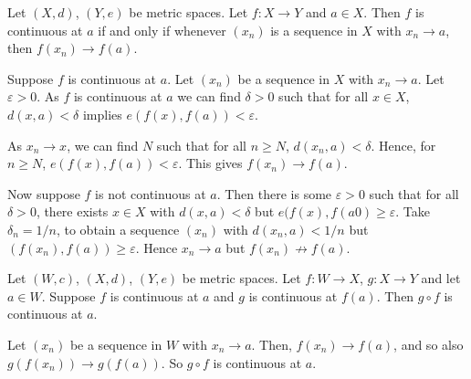 \documentclass[12pt]{article}
\begin{document}
\begin{proposition}
	Let $(X, d)$, $(Y, e)$ be metric spaces. Let $f : X \to Y$ and $a \in X$. Then $f$ is continuous at $a$ if and only if whenever $(x_n)$ is a sequence in $X$ with $x_n \to a$, then $f(x_n) \to f(a)$.
\end{proposition}

\begin{proofbox}
	Suppose $f$ is continuous at $a$. Let $(x_n)$ be a sequence in $X$ with $x_n \to a$. Let $\varepsilon > 0$. As $f$ is continuous at $a$ we can find $\delta > 0$ such that for all $x\in X$, $d(x, a) < \delta$ implies $e(f(x), f(a)) < \varepsilon$.

	As $x_n \to x$, we can find $N$ such that for all $n \geq N$, $d(x_n, a) < \delta$. Hence, for $n \geq N$, $e(f(x), f(a)) < \varepsilon$. This gives $f(x_n) \to f(a)$.

	Now suppose $f$ is not continuous at $a$. Then there is some $\varepsilon > 0$ such that for all $\delta > 0$, there exists $x \in X$ with $d(x, a) < \delta$ but $e(f(x), f(a0) \geq \varepsilon$. Take $\delta_n = 1/n$, to obtain a sequence $(x_n)$ with $d(x_n, a) < 1/n$ but $(f(x_n), f(a)) \geq \varepsilon$. Hence $x_n \to a$ but $f(x_n) \not \to f(a)$.
\end{proofbox}

\begin{proposition}
	Let $(W, c)$, $(X, d)$, $(Y, e)$ be metric spaces. Let $f : W \to X$, $g : X \to Y$ and let $a \in W$. Suppose $f$ is continuous at $a$ and $g$ is continuous at $f(a)$. Then $g \circ f$ is continuous at $a$.
\end{proposition}

\begin{proofbox}
	Let $(x_n)$ be a sequence in $W$ with $x_n \to a$. Then, $f(x_n) \to f(a)$, and so also $g(f(x_n)) \to g(f(a))$. So $g \circ f$ is continuous at $a$.
\end{proofbox}
\end{document}
